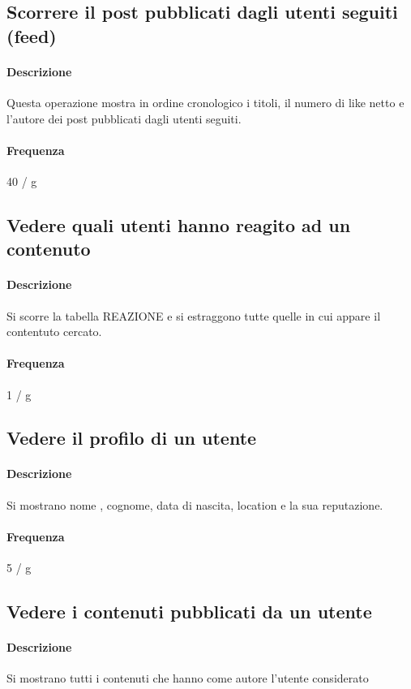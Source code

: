 \documentclass[a4paper,12pt]{report}
\begin{document}
\subsection{Scorrere il post pubblicati dagli utenti seguiti (feed)}
\paragraph{Descrizione} Questa operazione mostra in ordine cronologico i titoli, il numero di like netto e l'autore dei post pubblicati dagli utenti seguiti.
\paragraph{Frequenza} 40 / g

\subsection{Vedere quali utenti hanno reagito ad un contenuto}
\paragraph{Descrizione} Si scorre la tabella REAZIONE e si estraggono tutte quelle in cui appare il contentuto cercato. 
\paragraph{Frequenza} 1 / g

\subsection{Vedere il profilo di un utente}
\paragraph{Descrizione} Si mostrano nome , cognome, data di nascita, location e la sua reputazione.
\paragraph{Frequenza} 5 / g

\subsection{Vedere i contenuti pubblicati da un utente}
\paragraph{Descrizione} Si mostrano tutti i contenuti che hanno come autore l'utente considerato
\end{document}
